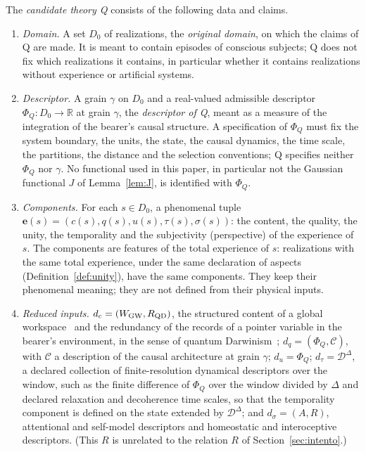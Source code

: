 \begin{definition}\label{def:phiQ}
The \emph{candidate theory Q} consists of the following data and claims.
\begin{enumerate}
\item[(a)] \emph{Domain.} A set $D_0$ of realizations, the \emph{original domain}, on which the claims of Q are made. It is meant to contain episodes of conscious subjects; Q does not fix which realizations it contains, in particular whether it contains realizations without experience or artificial systems.
\item[(b)] \emph{Descriptor.} A grain $\gamma$ on $D_0$ and a real-valued admissible descriptor $\Phi_Q:D_0\to\mathbb R$ at grain $\gamma$, the \emph{descriptor of Q}, meant as a measure of the integration of the bearer's causal structure. A specification of $\Phi_Q$ must fix the system boundary, the units, the state, the causal dynamics, the time scale, the partitions, the distance and the selection conventions; Q specifies neither $\Phi_Q$ nor $\gamma$. No functional used in this paper, in particular not the Gaussian functional $J$ of Lemma~\ref{lem:J}, is identified with $\Phi_Q$.
\item[(c)] \emph{Components.} For each $s\in D_0$, a phenomenal tuple $\mathbf e(s)=(c(s),q(s),u(s),\tau(s),\sigma(s))$: the content, the quality, the unity, the temporality and the subjectivity (perspective) of the experience of $s$. The components are features of the total experience of $s$: realizations with the same total experience, under the same declaration of aspects (Definition~\ref{def:unity}), have the same components. They keep their phenomenal meaning; they are not defined from their physical inputs.
\item[(d)] \emph{Reduced inputs.} $d_c=(W_{\rm GW},R_{\rm QD})$, the structured content of a global workspace~\cite{DehaeneChangeux2011} and the redundancy of the records of a pointer variable in the bearer's environment, in the sense of quantum Darwinism~\cite{Zurek2009}; $d_q=(\Phi_Q,\mathcal C)$, with $\mathcal C$ a description of the causal architecture at grain $\gamma$; $d_u=\Phi_Q$; $d_\tau=\mathcal D^\Delta$, a declared collection of finite-resolution dynamical descriptors over the window, such as the finite difference of $\Phi_Q$ over the window divided by $\Delta$ and declared relaxation and decoherence time scales, so that the temporality component is defined on the state extended by $\mathcal D^\Delta$; and $d_\sigma=(A,R)$, attentional and self-model descriptors and homeostatic and interoceptive descriptors. (This $R$ is unrelated to the relation $R$ of Section~\ref{sec:intento}.)

\end{enumerate}
\end{definition}
